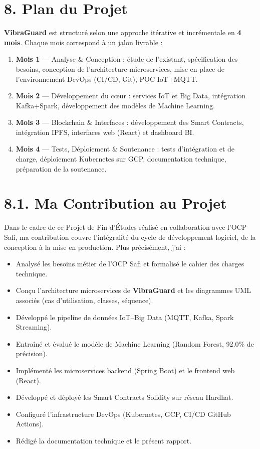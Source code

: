 \documentclass[12pt, a4paper, oneside]{report}
\newcommand{\projectname}{\textbf{VibraGuard}}
\begin{document}
\section*{8. Plan du Projet}

\projectname{} est structuré selon une approche itérative et incrémentale en \textbf{4 mois}. Chaque mois correspond à un jalon livrable :

\begin{enumerate}
  \item \textbf{Mois 1} --- Analyse \& Conception : étude de l'existant, spécification des
  besoins, conception de l'architecture microservices, mise en place de l'environnement
  DevOps (CI/CD, Git), POC IoT+MQTT.
  \item \textbf{Mois 2} --- Développement du c\oe{}ur : services IoT et Big Data, intégration
  Kafka+Spark, développement des modèles de Machine Learning.
  \item \textbf{Mois 3} --- Blockchain \& Interfaces : développement des Smart Contracts,
  intégration IPFS, interfaces web (React) et dashboard BI.
  \item \textbf{Mois 4} --- Tests, Déploiement \& Soutenance : tests d'intégration et de
  charge, déploiement Kubernetes sur GCP, documentation technique, préparation de la
  soutenance.
\end{enumerate}

\section*{8.1. Ma Contribution au Projet}

Dans le cadre de ce Projet de Fin d'Études réalisé en collaboration avec l'OCP Safi,
ma contribution couvre l'intégralité du cycle de développement logiciel, de la conception
à la mise en production. Plus précisément, j'ai :

\begin{itemize}
  \item Analysé les besoins métier de l'OCP Safi et formalisé le cahier des charges technique.
  \item Conçu l'architecture microservices de \projectname{} et les diagrammes UML associés
  (cas d'utilisation, classes, séquence).
  \item Développé le pipeline de données IoT--Big Data (MQTT, Kafka, Spark Streaming).
  \item Entraîné et évalué le modèle de Machine Learning (Random Forest, 92.0\% de précision).
  \item Implémenté les microservices backend (Spring Boot) et le frontend web (React).
  \item Développé et déployé les Smart Contracts Solidity sur réseau Hardhat.
  \item Configuré l'infrastructure DevOps (Kubernetes, GCP, CI/CD GitHub Actions).
  \item Rédigé la documentation technique et le présent rapport.
\end{itemize}
\end{document}
